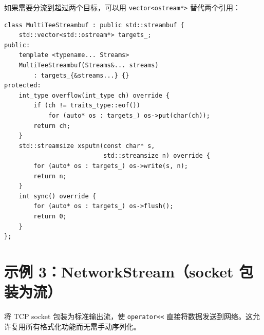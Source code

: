 \documentclass[12pt,a4paper,fontset=fandol]{ctexbook}
\newcommand{\Tp}[1]{\texttt{#1}}
\begin{document}
\begin{bestpractice}[title=扩展为 N 路 Tee]
如果需要分流到超过两个目标，可以用 \Tp{vector<ostream*>} 替代两个引用：

\begin{lstlisting}
class MultiTeeStreambuf : public std::streambuf {
    std::vector<std::ostream*> targets_;
public:
    template <typename... Streams>
    MultiTeeStreambuf(Streams&... streams)
        : targets_{&streams...} {}
protected:
    int_type overflow(int_type ch) override {
        if (ch != traits_type::eof())
            for (auto* os : targets_) os->put(char(ch));
        return ch;
    }
    std::streamsize xsputn(const char* s,
                           std::streamsize n) override {
        for (auto* os : targets_) os->write(s, n);
        return n;
    }
    int sync() override {
        for (auto* os : targets_) os->flush();
        return 0;
    }
};
\end{lstlisting}
\end{bestpractice}

\section{示例 3：NetworkStream（socket 包装为流）}

将 TCP socket 包装为标准输出流，使 \Tp{operator<<} 直接将数据发送到网络。这允许复用所有格式化功能而无需手动序列化。
\end{document}
